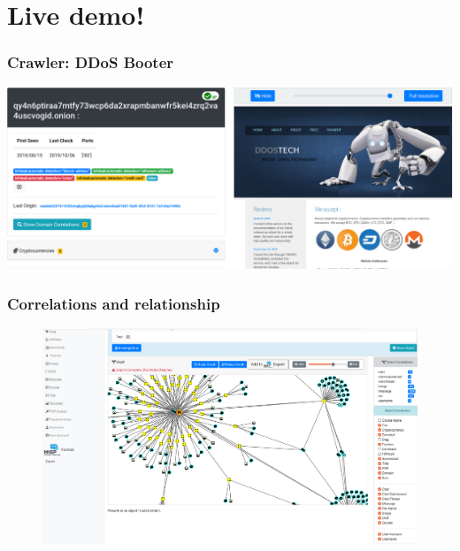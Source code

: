 \documentclass[aspectratio=169]{beamer}
\begin{document}
\section{Live demo!}

\begin{frame}
    \frametitle{Crawler: DDoS Booter}
    \centerline{
        \includegraphics[scale=0.23]{images/crawled-ddos.png}
    }
\end{frame}

\begin{frame}
    \frametitle{Correlations and relationship}
    \begin{figure}
        \includegraphics[scale=0.18, angle=0]{screenshot/correlation.png}
    \end{figure}
\end{frame}
\end{document}
